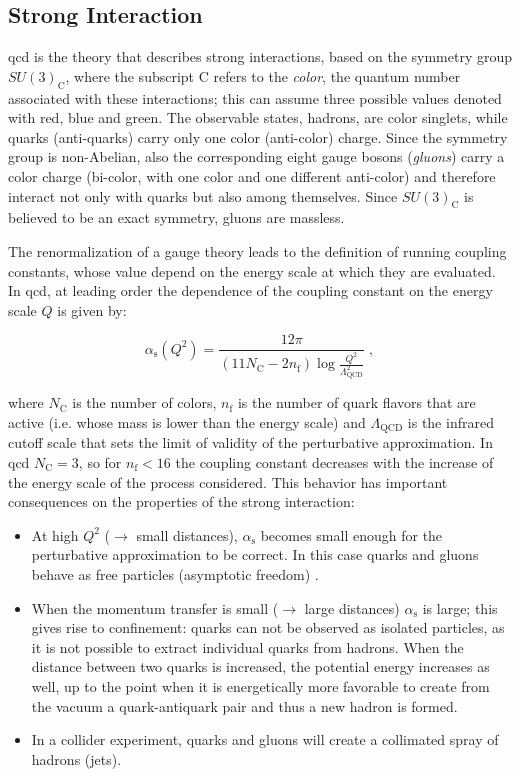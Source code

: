 \subsection{Strong Interaction}
\label{sec:strong}

\gls{qcd} is the theory that describes strong interactions, based on the symmetry group $SU(3)_\mathrm{C}$, where the subscript C refers to the \textit{color}, the quantum number associated with these interactions; this can assume three possible values denoted with red, blue and green. The observable states, hadrons, are color singlets, while quarks (anti-quarks) carry only one color (anti-color) charge. Since the symmetry group is non-Abelian, also the corresponding eight gauge bosons (\textit{gluons}) carry a color charge (bi-color, with one color and one different anti-color) and therefore interact not only with quarks but also among themselves. Since $SU(3)_\mathrm{C}$ is believed to be an exact symmetry,  gluons are massless. 

The renormalization of a gauge theory leads to the definition of running coupling constants, whose value depend on the energy scale at which they are evaluated. In \gls{qcd}, at leading order the dependence of the coupling constant on the energy scale $Q$ is given by:

\begin{equation}
\alpha_\mathrm{s}(Q^2)=\frac{12\pi}{\left(11N_\mathrm{C}-2n_\mathrm{f}\right)\log{\frac{Q^2}{\Lambda_\mathrm{QCD}^2}}} \; , 
\label{eq:alfaQCD}
\end{equation}

\noindent where $N_\mathrm{C}$ is the number of colors, $n_\mathrm{f}$ is the number of quark flavors that are active (i.e. whose mass is lower than the energy scale) and $\Lambda_\mathrm{QCD}$ is the infrared cutoff scale that sets the limit of validity of the perturbative approximation. In \gls{qcd} $N_\mathrm{C} = 3$, so for $n_\mathrm{f}<16$ the coupling constant decreases with the increase of the energy scale of the process considered. This behavior has important consequences on the properties of the strong interaction:

\begin{itemize}
\item At high $Q^2$ ($\rightarrow$ small distances), $\alpha_\mathrm{s}$ becomes small enough for the perturbative approximation to be correct. In this case quarks and gluons behave as free particles (asymptotic freedom) \cite{PhysRevLett.30.1343, PhysRevLett.30.1346}.
\item When the momentum transfer is small ($\rightarrow$ large distances) $\alpha_\mathrm{s}$ is large; this gives rise to confinement: quarks can not be observed as isolated particles, as it is not possible to extract individual quarks from hadrons. When the distance between two quarks is increased, the potential energy increases as well, up to the point when it is energetically more favorable to create from the vacuum a quark-antiquark pair and thus a new hadron is formed.
\item In a collider experiment, quarks and gluons will create a collimated spray of hadrons (jets).
\end{itemize}

